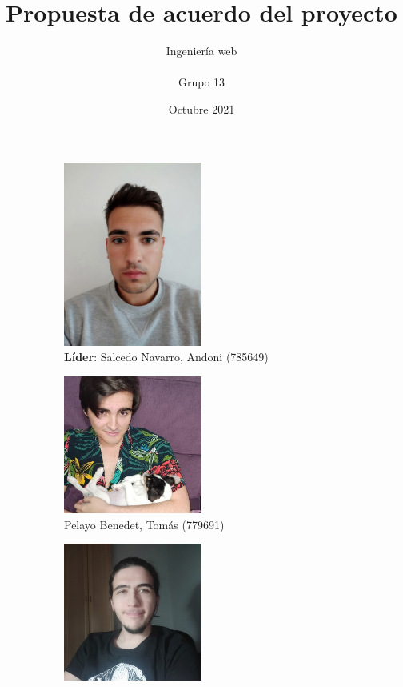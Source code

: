 \documentclass{article}
\title{Propuesta de acuerdo del proyecto}
\author{Ingeniería web\\\\Grupo 13}
\date{Octubre 2021}
\begin{document}
 
\maketitle
 
\begin{figure}[H]
    \captionsetup[subfigure]{justification=centering}
     \begin{subfigure}[b]{0.49\textwidth}
        \centering
         \includegraphics[width=0.5\textwidth]{../images/Andoni.jpeg}
         \caption*{\textbf{Líder}: Salcedo Navarro, Andoni (785649)}
     \end{subfigure}
     \hfill
     \begin{subfigure}[b]{0.49\textwidth}
        \centering
        \includegraphics[width=0.5\textwidth]{../images/Tomas.jpeg}
        \caption*{Pelayo Benedet, Tomás (779691)}
     \end{subfigure}
     \hfill
     \begin{subfigure}[b]{0.49\textwidth}
        \centering
        \includegraphics[width=0.5\textwidth]{../images/Ruben.jpeg}

\end{subfigure}
\end{figure}
\end{document}

